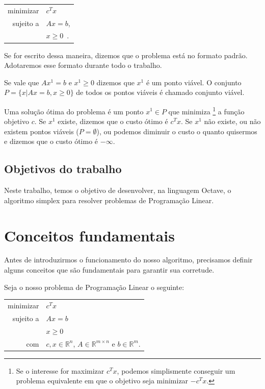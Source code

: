 \documentclass[12pt]{article}
\begin{document}
	\begin{center}
    	\begin{tabular}{r l}
	  		minimizar & $c^Tx$ \\
        
	        sujeito a & $Ax = b$, \\
       				  & $x \geq 0$~\cite{315book}.
        \end{tabular}
    \end{center}
    Se for escrito dessa maneira, dizemos que o problema está no formato padrão. Adotaremos esse formato durante todo o trabalho.
    
    Se vale que $Ax^1 = b$ e $x^1 \geq 0$ dizemos que $x^1$ é um ponto viável. O conjunto $P = \{x| Ax = b, x \geq 0\}$ de todos os pontos viáveis é chamado conjunto viável.
    
    Uma solução ótima do problema é um ponto $x^1 \in P$ que minimiza \footnote[1]{Se o interesse for maximizar ${c}^{T}x$, podemos simplismente conseguir um problema equivalente em que o objetivo seja minimizar $-{c}^{T}x$.} a função objetivo $c$. Se $x^1$ existe, dizemos que o custo ótimo é $c^Tx$. Se $x^1$ não existe, ou não existem pontos viáveis ($P = \emptyset$), ou podemos diminuir o custo o quanto quisermos e dizemos que o custo ótimo é $- \infty$.
    

\subsection{Objetivos do trabalho}
	Neste trabalho, temos o objetivo de desenvolver, na linguagem Octave, o algoritmo simplex para resolver problemas de Programação Linear.

\newpage
\section{Conceitos fundamentais}
	Antes de introduzirmos o funcionamento do nosso algoritmo, precisamos definir alguns conceitos que são fundamentais para garantir sua corretude.

	Seja o nosso problema de Programação Linear o seguinte:
    \begin{center}
    	\begin{tabular}{r l}
	  		minimizar & $c^Tx$ \\
        
        	sujeito a & $Ax = b$ \\
            & $x \geq 0$ \\
       	
        
        com & $c, x \in \mathbb{R}^n$, $A \in \mathbb{R}^{m \times n}$ e $b \in \mathbb{R}^{m}$.
        \end{tabular}
    \end{center}
\end{document}
